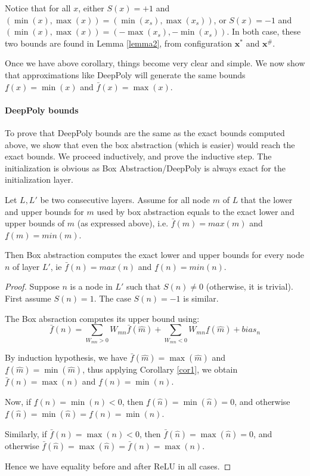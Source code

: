 		
		Notice that for all $x$, either $S(x)=+1$ and 
		$(\min(x),\max(x))=(\min(x_s),\max(x_s))$, 
		or $S(x)=-1$ and $(\min(x),\max(x))=(-\max(x_s),-\min(x_s))$.
		In both case, these two bounds are found in Lemma \ref{lemma2},
		from configuration $\boldsymbol{x}^*$ and $\boldsymbol{x}^\#$.
		
		
		
		Once we have above corollary, things become very clear and simple. We now show that approximations like DeepPoly will generate the same bounds 
		$\underline{f}(x)=\min(x)$ and $\bar{f}(x)=\max(x)$.
		
		\paragraph{DeepPoly bounds}
		
		To prove that DeepPoly bounds are the same as the exact bounds computed above, 
		we show that even the box abstraction (which is easier) would reach the exact bounds.
		We proceed inductively, and prove the inductive step.
		The initialization is obvious as Box Abstraction/DeepPoly is always exact for the initialization layer.
		
		\begin{lemma}
			Let $L,L'$ be two consecutive layers.
			Assume for all node $m$ of $L$ that the lower and upper bounds for $m$ used by box abstraction equals to the exact lower and upper bounds of $m$ (as expressed above), i.e.
			$\bar{f}(m)=max(m)$ and $\underline{f}(m)=min(m)$.
			
			Then Box abstraction computes the exact lower and upper bounds for every node $n$ of layer $L'$, ie $\bar{f}(n)=max(n)$ and $\underline{f}(n)=min(n)$.
		\end{lemma}
		
		\begin{proof}
			Suppose $n$ is a node in $L'$ such that $S(n)\neq 0$ (otherwise, it is trivial). 
			First assume $S(n)=1$. The case $S(n)=-1$ is similar. 
			
			The Box absraction computes its upper bound using:
			$$\bar{f}(n)= \sum_{W_{mn}>0} W_{mn} \bar{f}(\hat{m}) + \sum_{W_{mn}<0} W_{mn} \underline{f}(\hat{m}) + bias_n$$
			
			By induction hypothesis, we have 
			$\bar{f}(\hat{m})=\max(\hat{m})$ and
			$\underline{f}(\hat{m})=\min(\hat{m})$, thus 
			applying Corollary \ref{cor1}, we obtain
			$\bar{f}(n)=\max(n)$ and 
			$\underline{f}(n)=\min(n)$.
			
			Now, if $\underline{f}(n)=\min(n)<0$, 
			then $\underline{f}(\hat{n})=\min(\hat{n})=0$, 
			and otherwise 
			$\underline{f}(\hat{n})=\min(\hat{n})=\underline{f}(n)=\min(n)$.
			
			Similarly, 
			if $\bar{f}(n)=\max(n)<0$, 
			then $\bar{f}(\hat{n})=\max(\hat{n})=0$, 
			and otherwise 
			$\bar{f}(\hat{n})=\max(\hat{n})=\bar{f}(n)=\max(n)$.
			
			Hence we have equality before and after ReLU in all cases.
		\end{proof}
		

